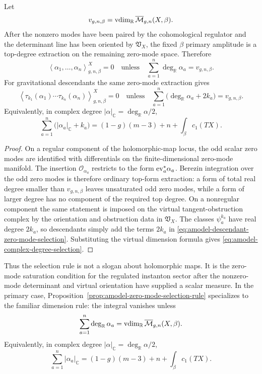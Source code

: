 \begin{proposition}
\label{prop:amodel-zero-mode-selection-rule}
Let
\[
  v_{g,n,\beta}
  =
  {\rm vdim}_{\mathbb R}\,
  \overline{\mathcal M}_{g,n}(X,\beta).
\]
After the nonzero modes have been paired by the cohomological regulator and
the determinant line has been oriented by \(\mathfrak V_X\), the fixed
\(\beta\) primary amplitude is a top-degree extraction on the remaining
zero-mode space.  Therefore
\[
  \left\langle \alpha_1,\ldots,\alpha_n
  \right\rangle_{g,n,\beta}^{X}=0
  \quad\text{unless}\quad
  \sum_{a=1}^n\deg_{\mathbb R}\alpha_a=v_{g,n,\beta}.
\]
For gravitational descendants the same zero-mode extraction gives
\begin{equation}
  \left\langle
  \tau_{k_1}(\alpha_1)\cdots\tau_{k_n}(\alpha_n)
  \right\rangle_{g,n,\beta}^{X}=0
  \quad\text{unless}\quad
  \sum_{a=1}^n\bigl(\deg_{\mathbb R}\alpha_a+2k_a\bigr)
  =
  v_{g,n,\beta}.
  \label{eq:amodel-descendant-zero-mode-selection}
\end{equation}
Equivalently, in complex degree
\(|\alpha|_{\mathbb C}=\deg_{\mathbb R}\alpha/2\),
\begin{equation}
  \sum_{a=1}^n\bigl(|\alpha_a|_{\mathbb C}+k_a\bigr)
  =
  (1-g)(m-3)+n+\int_\beta c_1(TX).
  \label{eq:amodel-complex-degree-selection}
\end{equation}
\end{proposition}

\begin{proof}
On a regular component of the holomorphic-map locus, the odd scalar zero modes
are identified with differentials on the finite-dimensional zero-mode
manifold.  The insertion \(\mathcal O_{\alpha_a}\) restricts to the form
\({\rm ev}_a^\ast\alpha_a\).  Berezin integration over the odd zero modes is
therefore ordinary top-form extraction: a form of total real degree smaller
than \(v_{g,n,\beta}\) leaves unsaturated odd zero modes, while a form of
larger degree has no component of the required top degree.  On a nonregular
component the same statement is imposed on the virtual tangent-obstruction
complex by the orientation and obstruction data in \(\mathfrak V_X\).  The
classes \(\psi_a^{k_a}\) have real degree \(2k_a\), so descendants simply add
the terms \(2k_a\) in
\eqref{eq:amodel-descendant-zero-mode-selection}.  Substituting the virtual
dimension formula gives
\eqref{eq:amodel-complex-degree-selection}.
\end{proof}

Thus the selection rule is not a slogan about holomorphic maps.  It is the
zero-mode saturation condition for the regulated instanton sector after the
nonzero-mode determinant and virtual orientation have supplied a scalar
measure.  In the primary case,
Proposition~\ref{prop:amodel-zero-mode-selection-rule} specializes to the
familiar dimension rule: the integral vanishes unless
\[
  \sum_{a=1}^n \deg_{\mathbb R}\alpha_a
  =
  {\rm vdim}_{\mathbb R}\,\overline{\mathcal M}_{g,n}(X,\beta).
\]
Equivalently, in complex degree \(|\alpha|_{\mathbb C}=\deg_{\mathbb R}\alpha/2\),
\[
  \sum_{a=1}^n |\alpha_a|_{\mathbb C}
  =
  (1-g)(m-3)+n+\int_\beta c_1(TX).
\]

